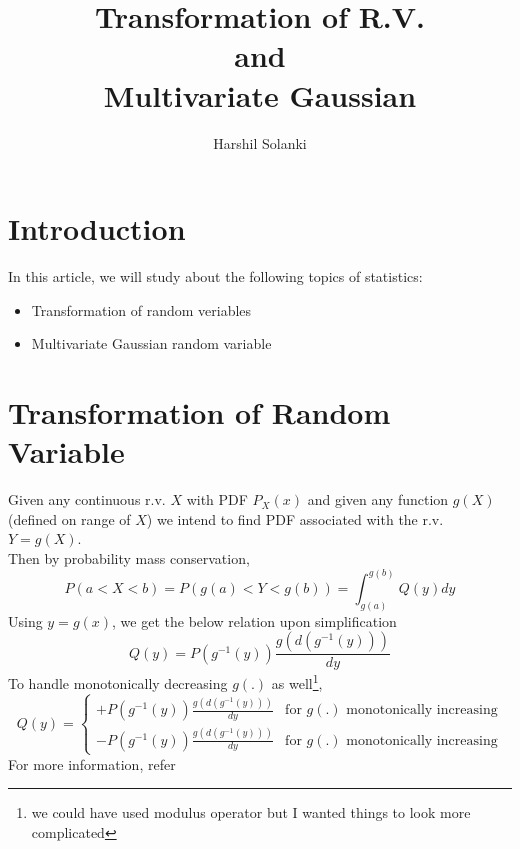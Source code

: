 \documentclass{article}
\begin{document}
\title{
Transformation of R.V. \\
and \\
Multivariate Gaussian
}
\author{Harshil Solanki}
\date{}
\maketitle
\tableofcontents
\clearpage

\section{Introduction}
In this article, we will study about the following topics of statistics:
\begin{itemize}
\item Transformation of random veriables
\item Multivariate Gaussian random variable
\end{itemize}
\section{Transformation of Random Variable}
Given any continuous r.v. $X$ with PDF $P_X(x)$ and given any function $g(X)$(defined on range of $X$) we intend to find PDF associated with the r.v. $Y = g(X)$.\\
Then by probability mass conservation,
\[
P(a<X<b) = P(g(a)<Y<g(b)) = \int_{g(a)}^{g(b)} Q(y)dy
\]
Using $y=g(x)$, we get the below relation upon simplification
\[
Q(y) = P(g^{-1}(y))\frac{g(d(g^{-1}(y)))}{dy}
\]
To handle monotonically decreasing $g(.)$ as well\footnote[1]{we could have used modulus operator but I wanted things to look more complicated},
\begin{equation}
    Q(y)=
    \begin{cases}
        +P(g^{-1}(y))\frac{g(d(g^{-1}(y)))}{dy} & \text{for $g(.)$ monotonically increasing}\\
        -P(g^{-1}(y))\frac{g(d(g^{-1}(y)))}{dy} & \text{for $g(.)$ monotonically increasing}
    \end{cases}
\end{equation}
For more information, refer \cite{ref1}
\end{document}
